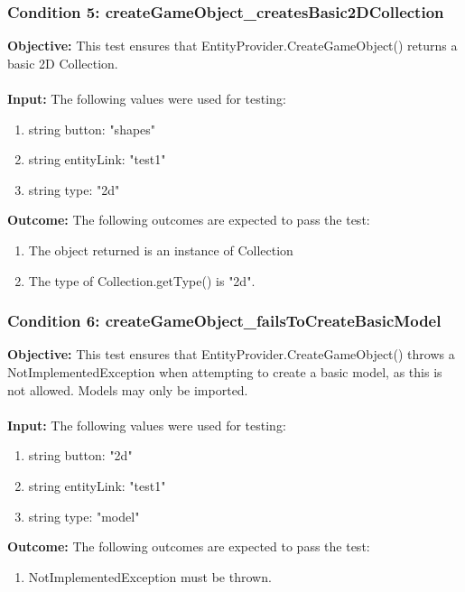 \documentclass[a4paper,12pt]{article}
\begin{document}
		\subsubsection{Condition 5: createGameObject\_createsBasic2DCollection}
			\textbf{Objective:} This test ensures that EntityProvider.CreateGameObject() returns a basic 2D Collection.\\\\
			\textbf{Input:} The following values were used for testing:
				\begin{enumerate}
					\item string button: "shapes"
					\item string entityLink: "test1"
					\item string type: "2d"
				\end{enumerate}
			\textbf{Outcome:} The following outcomes are expected to pass the test:
				\begin{enumerate}
					\item The object returned is an instance of Collection
					\item The type of Collection.getType() is "2d".
				\end{enumerate}
		\subsubsection{Condition 6: createGameObject\_failsToCreateBasicModel}
			\textbf{Objective:} This test ensures that EntityProvider.CreateGameObject() throws a NotImplementedException when attempting to create a basic model, as this is not allowed. Models may only be imported.\\\\
			\textbf{Input:} The following values were used for testing:
				\begin{enumerate}
					\item string button: "2d"
					\item string entityLink: "test1"
					\item string type: "model"
				\end{enumerate}
			\textbf{Outcome:} The following outcomes are expected to pass the test:
				\begin{enumerate}
					\item NotImplementedException must be thrown.
				\end{enumerate}
\end{document}
